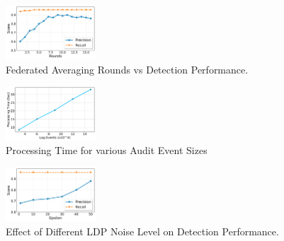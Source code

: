 \begin{figure}[t!]
  \centering
  \includegraphics[width=0.3\textwidth]{fig/roundsvsscore.pdf}
  \caption{Federated Averaging Rounds vs Detection Performance.}
  \label{roundsvsscore}
  \vspace{-2ex}
\end{figure}

\begin{figure}[t!]
  \centering
  \includegraphics[width=0.3\textwidth]{fig/sizevstime.pdf}
  \caption{Processing Time for various Audit Event Sizes}
  \label{sizevstime}
  \vspace{-2ex}
\end{figure}

\begin{figure}[t!]
  \centering
  \includegraphics[width=0.3\textwidth]{fig/epsvsscore.pdf}
  \caption{Effect of Different LDP Noise Level on Detection Performance.}
  \label{epsvsscore}
  \vspace{-2ex}
\end{figure}

